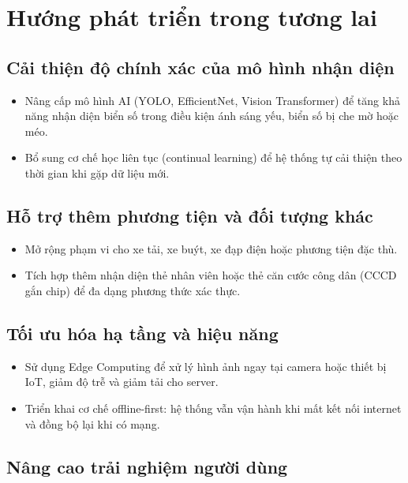 \section{Hướng phát triển trong tương lai}

\subsection{Cải thiện độ chính xác của mô hình nhận diện}

\begin{itemize}
    \item Nâng cấp mô hình AI (YOLO, EfficientNet, Vision Transformer) để tăng khả năng nhận diện biển số trong điều kiện ánh sáng yếu, biển số bị che mờ hoặc méo.

    \item Bổ sung cơ chế học liên tục (continual learning) để hệ thống tự cải thiện theo thời gian khi gặp dữ liệu mới.
\end{itemize}

\subsection{Hỗ trợ thêm phương tiện và đối tượng khác}

\begin{itemize}
    \item Mở rộng phạm vi cho xe tải, xe buýt, xe đạp điện hoặc phương tiện đặc thù.

    \item Tích hợp thêm nhận diện thẻ nhân viên hoặc thẻ căn cước công dân (CCCD gắn chip) để đa dạng phương thức xác thực.
\end{itemize}

\subsection{Tối ưu hóa hạ tầng và hiệu năng}

\begin{itemize}
    \item Sử dụng Edge Computing để xử lý hình ảnh ngay tại camera hoặc thiết bị IoT, giảm độ trễ và giảm tải cho server.

    \item Triển khai cơ chế offline-first: hệ thống vẫn vận hành khi mất kết nối internet và đồng bộ lại khi có mạng.
\end{itemize}

\subsection{Nâng cao trải nghiệm người dùng}

